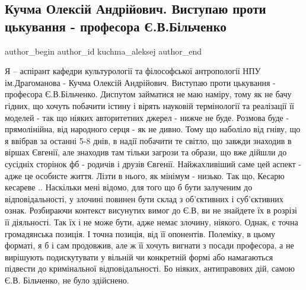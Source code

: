  
 
 
 
 
 
\subsection{Кучма Олексій Андрійович. Виступаю проти цькування - професора Є.В.Більченко}
\label{sec:28_01_2021.fb.kuchma_aleksej.1.bilchenko_evgenia_travlja}
\ifcmt
 author_begin
   author_id kuchma_aleksej
 author_end
\fi

Я – аспірант кафедри культурології та філософської антропології НПУ
ім.Драгоманова - Кучма Олексій Андрійович. Виступаю проти цькування - професора
Є.В.Більченко. Диспутом займатися не маю наміру, тому як не бачу гідних, що
хочуть побачити істину і вірять науковій термінології  та реалізації її моделей
- так що ніяких авторитетних джерел - нижче не буде. Розмова буде -
прямолінійна, від народного серця - як не дивно. Тому що наболіло від гніву, що
я ввібрав за останні 5-8 днів, в надії побачити те світло, що завжди знаходив в
віршах Євгенії, але знаходив там тільки загрози та образи, що вже дійшли до
сусідніх сторінок фб - родичів і друзів Євгенії. Найжахливіший саме цей аспект
- адже це особисте життя. Лізти в нього, як мінімум - низько. Так що, Кесарю
кесареве .. Наскільки мені відомо, для того що б бути залученим до
відповідальності, у злочині повинен бути склад з об'єктивних і суб'єктивних
ознак. Розбираючи контекст висунутих вимог до Є.В, ви не знайдете їх в розрізі
її діяльності. Так їх і не може бути, адже немає злочину, ніякого. Однак, є
точна громадянська позиція. І точна позиція, від її опонентів. Полеміку, в
цьому форматі, я б і сам продовжив, але ж її хочуть вигнати з посади професора,
а не вирішують подискутувати у вільній чи конкретній формі або намагаються
підвести до кримінальної відповідальності. Бо ніяких, антиправових дій, самою
Є.В. Більченко, не було здійснено.

